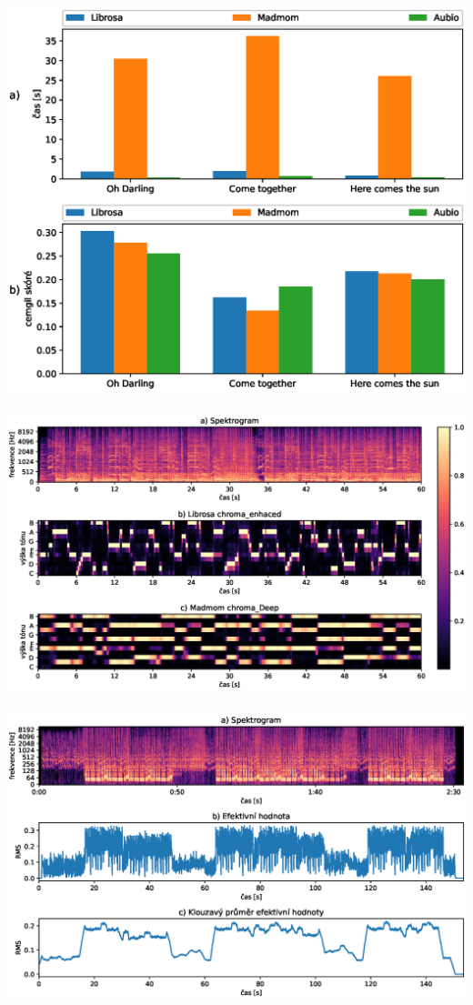 \documentclass[%
  12pt,       				%
	t,                  %
	aspectratio=1610,   %
	unicode,						%
]{beamer}				    	%
\begin{document}
\begin{frame}
	\frametitle{}
	\centering
	\includegraphics[width = 0.75\columnwidth]{obrazky/Beat_tracking_time_and_cemgil_graphs.eps}
\end{frame}

\begin{frame}
	\frametitle{}
	\centering
	\includegraphics[width = 1\columnwidth]{obrazky/Chromavector_presentation.eps}
\end{frame}

\begin{frame}
	\frametitle{}
	\centering
	\includegraphics[width = 1\columnwidth]{obrazky/Belly_dancer_RMS.eps}
\end{frame}
\end{document}
